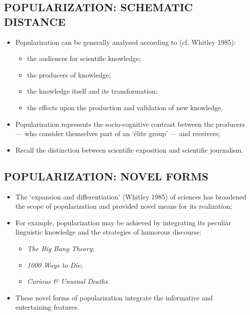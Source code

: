 \subsection{POPULARIZATION: SCHEMATIC DISTANCE} 

\begin{itemize}

\item  Popularization can be generally analysed according to (cf. Whitley 1985):

\begin{itemize}
\item the audiences for scientific knowledge;
\item the producers of knowledge;
\item the knowledge itself and its transformation;
\item the effects upon the production and validation of new knowledge.
\end{itemize}

\item Popularization represents the socio-cognitive contrast between the producers — who consider themselves part of an ‘élite group’ — and receivers;

\item Recall the distinction between scientific exposition and scientific journalism. 

\end{itemize}

\subsection{POPULARIZATION: NOVEL FORMS}

\begin{itemize}

\item The ‘expansion and differentiation’ (Whitley 1985) of sciences has broadened the scope of popularization and provided novel means for its realization;
\item For example, popularization may be achieved by integrating its peculiar linguistic knowledge and the strategies of humorous discourse:

\begin{itemize}
\item \textit{The Big Bang Theory};
\item \textit{1000 Ways to Die};
\item \textit{Curious \& Unusual Deaths}.
\end{itemize}

\item These novel forms of popularization integrate the informative and entertaining features. 

\end{itemize}

